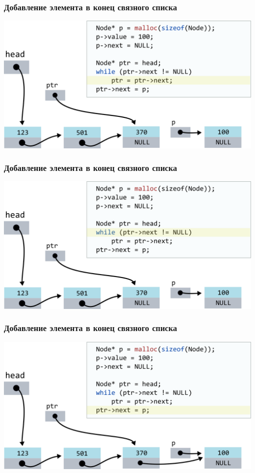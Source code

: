 \documentclass[10pt,pdf,hyperref={unicode}]{beamer}
\begin{document}
\begin{frame}[fragile]
\frametitle{Добавление элемента в конец связного списка}
\begin{center}
\includegraphics[width=\imageSizeMult\linewidth]{../images/codelist/codelistf_insert9.png}
\end{center}
\end{frame}



\begin{frame}[fragile]
\frametitle{Добавление элемента в конец связного списка}
\begin{center}
\includegraphics[width=\imageSizeMult\linewidth]{../images/codelist/codelistf_insert10.png}
\end{center}
\end{frame}



\begin{frame}[fragile]
\frametitle{Добавление элемента в конец связного списка}
\begin{center}
\includegraphics[width=\imageSizeMult\linewidth]{../images/codelist/codelistf_insert11.png}
\end{center}
\end{frame}
\end{document}
